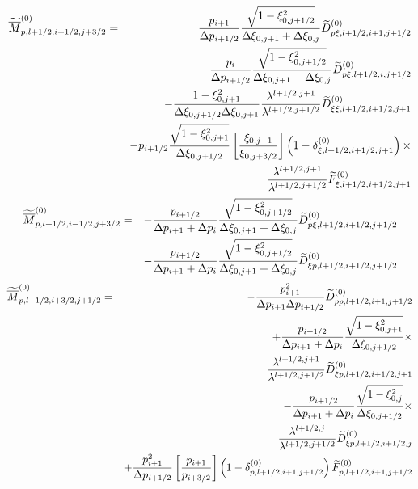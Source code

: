 \begin{eqnarray}
\widetilde{\overline{M}}_{p,l+1/2,i+1/2,j+3/2}^{\left( 0\right) } &=&\frac{%
p_{i+1}}{\Delta p_{i+1/2}}\frac{\sqrt{1-\xi _{0,j+1/2}^{2}}}{\Delta \xi
_{0,j+1}+\Delta \xi _{0,j}}\widetilde{D}_{p\xi ,l+1/2,i+1,j+1/2}^{\left(
0\right) }  \nonumber \\
&&-\frac{p_{i}}{\Delta p_{i+1/2}}\frac{\sqrt{1-\xi _{0,j+1/2}^{2}}}{\Delta %
\xi _{0,j+1}+\Delta \xi _{0,j}}\widetilde{D}_{p\xi ,l+1/2,i,j+1/2}^{\left(
0\right) }  \nonumber \\
&&-\frac{1-\xi _{0,j+1}^{2}}{\Delta \xi _{0,j+1/2}\Delta \xi _{0,j+1}}\frac{%
\lambda ^{l+1/2,j+1}}{\lambda ^{l+1/2,j+1/2}}\widetilde{D}_{\xi \xi
,l+1/2,i+1/2,j+1}^{\left( 0\right) }  \nonumber \\
&&-p_{i+1/2}\frac{\sqrt{1-\xi _{0,j+1}^{2}}}{\Delta \xi _{0,j+1/2}}\left[
\frac{\xi _{0,j+1}}{\xi _{0,j+3/2}}\right] \left( 1-\delta _{\xi
,l+1/2,i+1/2,j+1}^{\left( 0\right) }\right) \times   \nonumber \\
&&\frac{\lambda ^{l+1/2,j+1}}{\lambda ^{l+1/2,j+1/2}}\widetilde{F}_{\xi
,l+1/2,i+1/2,j+1}^{\left( 0\right) }\nonumber \\
\end{eqnarray}
\begin{eqnarray}
\widetilde{\overline{M}}_{p,l+1/2,i-1/2,j+3/2}^{\left( 0\right) } &=&-\frac{%
p_{i+1/2}}{\Delta p_{i+1}+\Delta p_{i}}\frac{\sqrt{1-\xi _{0,j+1/2}^{2}}}{%
\Delta \xi _{0,j+1}+\Delta \xi _{0,j}}\widetilde{D}_{p\xi
,l+1/2,i+1/2,j+1/2}^{\left( 0\right) }  \nonumber \\
&&-\frac{p_{i+1/2}}{\Delta p_{i+1}+\Delta p_{i}}\frac{\sqrt{1-\xi
_{0,j+1/2}^{2}}}{\Delta \xi _{0,j+1}+\Delta \xi _{0,j}}\widetilde{D}_{\xi
p,l+1/2,i+1/2,j+1/2}^{\left( 0\right) }\nonumber \\
\end{eqnarray}
\begin{eqnarray}
\widetilde{\overline{M}}_{p,l+1/2,i+3/2,j+1/2}^{\left( 0\right) } &=&-\frac{%
p_{i+1}^{2}}{\Delta p_{i+1}\Delta p_{i+1/2}}\widetilde{D}%
_{pp,l+1/2,i+1,j+1/2}^{\left( 0\right) }  \nonumber \\
&&+\frac{p_{i+1/2}}{\Delta p_{i+1}+\Delta p_{i}}\frac{\sqrt{1-\xi
_{0,j+1}^{2}}}{\Delta \xi _{0,j+1/2}}\times   \nonumber \\
&&\frac{\lambda ^{l+1/2,j+1}}{\lambda ^{l+1/2,j+1/2}}\widetilde{D}_{\xi
p,l+1/2,i+1/2,j+1}^{\left( 0\right) }  \nonumber \\
&&-\frac{p_{i+1/2}}{\Delta p_{i+1}+\Delta p_{i}}\frac{\sqrt{1-\xi _{0,j}^{2}}%
}{\Delta \xi _{0,j+1/2}}\times   \nonumber \\
&&\frac{\lambda ^{l+1/2,j}}{\lambda ^{l+1/2,j+1/2}}\widetilde{D}_{\xi
p,l+1/2,i+1/2,j}^{\left( 0\right) }  \nonumber \\
&&+\frac{p_{i+1}^{2}}{\Delta p_{i+1/2}}\left[ \frac{p_{i+1}}{p_{i+3/2}}%
\right] \left( 1-\delta _{p,l+1/2,i+1,j+1/2}^{\left( 0\right) }\right)
\widetilde{F}_{p,l+1/2,i+1,j+1/2}^{\left( 0\right) }\nonumber \\
\end{eqnarray}
